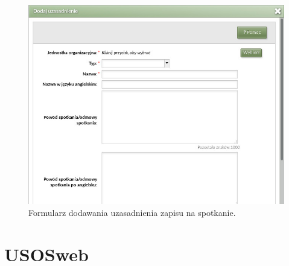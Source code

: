 \documentclass[licencjacka]{pracamgr}
\begin{document}
\begin{figure}[!]
  \includegraphics[width=\linewidth]{formularz_uzasadnien.jpg}
  \caption{Formularz dodawania uzasadnienia zapisu na spotkanie.}
  \label{fig:formularz_uzasadnienia}
\end{figure}


\section{USOSweb} \label{sec:impusosweb}
\end{document}
